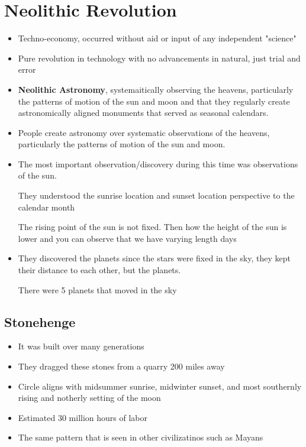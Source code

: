 \documentclass{article}
\begin{document}
\section*{Neolithic Revolution}
\begin{itemize}
  \item Techno-economy,
    occurred without aid or input of any independent "science"
  \item Pure revolution in technology with no advancements
    in natural, just trial and error
  \item \textbf{Neolithic Astronomy}, systemaitically observing the heavens,
    particularly the patterns of motion of the sun and moon and
    that they regularly create astronomically aligned monuments
    that served as seasonal calendars.
  \item People create astronomy over systematic observations
    of the heavens, particularly the patterns of motion of the sun and moon.
  \item The most important observation/discovery during this time was
    observations of the sun.

    They understood the sunrise location and sunset location perspective
    to the calendar month

    The rising point of the sun is not fixed. Then how the height of the sun is lower
    and you can observe that we have varying length days
  \item They discovered the planets since the stars were fixed in the sky,
    they kept their distance to each other, but the planets.

    There were 5 planets that moved in the sky
\end{itemize}

\subsection{Stonehenge}
\begin{itemize}
  \item It was built over many generations
  \item They dragged these stones from a quarry
    200 miles away
  \item Circle aligns with midsummer sunrise, midwinter sunset, and most southernly
    rising and notherly setting of the moon
  \item Estimated 30 million hours of labor
  \item The same pattern that is seen in other
    civilizatinos such as Mayans
\end{itemize}
\end{document}

